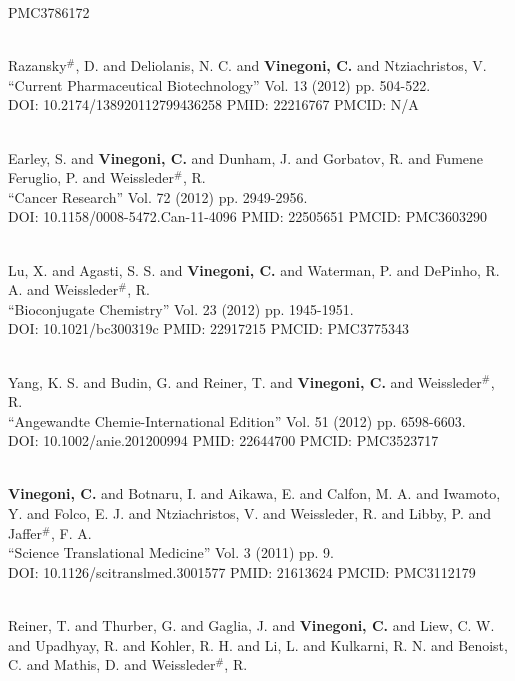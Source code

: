 PMC3786172\item {} \\ Razansky$^\#$, D. and Deliolanis, N. C. and {\bf Vinegoni, C.} and Ntziachristos, V. \\ ``Current Pharmaceutical Biotechnology'' Vol. 13 (2012) pp. 504-522. \\ DOI: 10.2174/138920112799436258 PMID: 22216767 PMCID: N/A\item {} \\ Earley, S. and {\bf Vinegoni, C.} and Dunham, J. and Gorbatov, R. and Fumene Feruglio, P. and Weissleder$^\#$, R. \\ ``Cancer Research'' Vol. 72 (2012) pp. 2949-2956. \\ DOI: 10.1158/0008-5472.Can-11-4096 PMID: 22505651 PMCID: PMC3603290\item {} \\ Lu, X. and Agasti, S. S. and {\bf Vinegoni, C.} and Waterman, P. and DePinho, R. A. and Weissleder$^\#$, R. \\ ``Bioconjugate Chemistry'' Vol. 23 (2012) pp. 1945-1951. \\ DOI: 10.1021/bc300319c PMID: 22917215 PMCID: PMC3775343\item {} \\ Yang, K. S. and Budin, G. and Reiner, T. and {\bf Vinegoni, C.} and Weissleder$^\#$, R. \\ ``Angewandte Chemie-International Edition'' Vol. 51 (2012) pp. 6598-6603. \\ DOI: 10.1002/anie.201200994 PMID: 22644700 PMCID: PMC3523717\item {} \\ {\bf Vinegoni, C.} and Botnaru, I. and Aikawa, E. and Calfon, M. A. and Iwamoto, Y. and Folco, E. J. and Ntziachristos, V. and Weissleder, R. and Libby, P. and Jaffer$^\#$, F. A. \\ ``Science Translational Medicine'' Vol. 3 (2011) pp. 9. \\ DOI: 10.1126/scitranslmed.3001577 PMID: 21613624 PMCID: PMC3112179\item {} \\ Reiner, T. and Thurber, G. and Gaglia, J. and {\bf Vinegoni, C.} and Liew, C. W. and Upadhyay, R. and Kohler, R. H. and Li, L. and Kulkarni, R. N. and Benoist, C. and Mathis, D. and Weissleder$^\#$, R. 